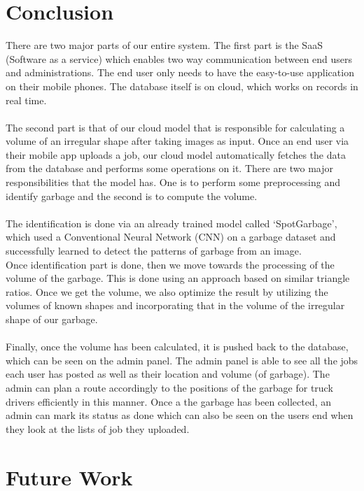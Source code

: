 \section{Conclusion}

There are two major parts of our entire system. The first part is the SaaS (Software as a service) which enables two way communication between end users and administrations. The end user only needs to have the easy-to-use application on their mobile phones. The database itself is on cloud, which works on records in real time. \\
\\
The second part is that of our cloud model that is responsible for calculating a volume of an irregular shape after taking images as input. Once an end user via their mobile app uploads a job, our cloud model automatically fetches the data from the database and performs some operations on it. There are two major responsibilities that the model has. One is to perform some preprocessing and identify garbage and the second is to compute the volume.\\
\\
The identification is done via an already trained model called ‘SpotGarbage’, which used a Conventional Neural Network (CNN) on a garbage dataset and successfully learned to detect the patterns of garbage from an image.  \\
Once identification part is done, then we move towards the processing of the volume of the garbage. This is done using an approach based on similar triangle ratios.  Once we get the volume, we also optimize the result by utilizing the volumes of known shapes and incorporating that in the volume of the irregular shape of our garbage.\\
\\
Finally, once the volume has been calculated, it is pushed back to the database, which can be seen on the admin panel. The admin panel is able to see all the jobs each user has posted as well as their location and volume (of garbage). The admin can plan a route accordingly to the positions of the garbage for truck drivers efficiently in this manner. Once a the garbage has been collected, an admin can mark its status as done which can also be seen on the users end when they look at the lists of job they uploaded.


\section{Future Work}

